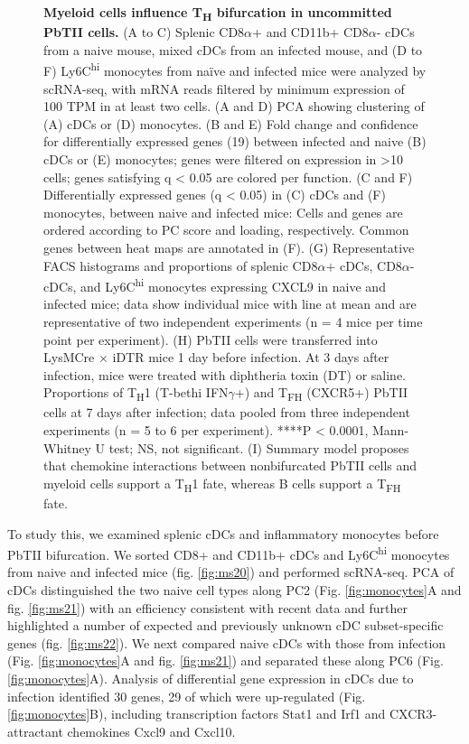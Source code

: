 \begin{figure} [t!]
      \caption[Myeloid cells influence T\textsubscript{H} bifurcation in uncommitted PbTII cells]{\textbf{Myeloid cells influence T\textsubscript{H} bifurcation in uncommitted PbTII cells.} (A to C) Splenic CD8\( \alpha \)+ and CD11b+ CD8\( \alpha \)- cDCs from a naive mouse, mixed cDCs from an infected mouse, and (D to F) Ly6C\textsuperscript{hi} monocytes from naïve and infected mice were analyzed by scRNA-seq, with mRNA reads filtered by minimum expression of 100 TPM in at least two cells. (A and D) PCA showing clustering of (A) cDCs or (D) monocytes. (B and E) Fold change and confidence for differentially expressed genes (19) between infected and naive (B) cDCs or (E) monocytes; genes were filtered on expression in >10 cells; genes satisfying q < 0.05 are colored per function. (C and F) Differentially expressed genes (q < 0.05) in (C) cDCs and (F) monocytes, between naive and infected mice: Cells and genes are ordered according to PC score and loading, respectively. Common genes between heat maps are annotated in (F). (G) Representative FACS histograms and proportions of splenic CD8\( \alpha \)+ cDCs, CD8\( \alpha \)- cDCs, and Ly6C\textsuperscript{hi} monocytes expressing CXCL9 in naive and infected mice; data show individual mice with line at mean and are representative of two independent experiments (n = 4 mice per time point per experiment). (H) PbTII cells were transferred into LysMCre × iDTR mice 1 day before infection. At 3 days after infection, mice were treated with diphtheria toxin (DT) or saline. Proportions of T\textsubscript{H}1 (T-bethi IFN\( \gamma \)+) and T\textsubscript{FH} (CXCR5+) PbTII cells at 7 days after infection; data pooled from three independent experiments (n = 5 to 6 per experiment). ****P < 0.0001, Mann-Whitney U test; NS, not significant. (I) Summary model proposes that chemokine interactions between nonbifurcated PbTII cells and myeloid cells support a T\textsubscript{H}1 fate, whereas B cells support a T\textsubscript{FH} fate.}
\end{figure}

To study this, we examined splenic cDCs and inflammatory monocytes before PbTII bifurcation. We sorted CD8+ and CD11b+ cDCs and Ly6C\textsuperscript{hi} monocytes from naive and infected mice (fig. \ref{fig:ms20}) and performed scRNA-seq. PCA of cDCs distinguished the two naive cell types along PC2 (Fig. \ref{fig:monocytes}A and fig. \ref{fig:ms21}) with an efficiency consistent with recent data \cite{Jaitin2014-pk} and further highlighted a number of expected and previously unknown cDC subset-specific genes (fig. \ref{fig:ms22}). We next compared naive cDCs with those from infection (Fig. \ref{fig:monocytes}A and fig. \ref{fig:ms21}) and separated these along PC6 (Fig. \ref{fig:monocytes}A). Analysis of differential gene expression in cDCs due to infection identified 30 genes, 29 of which were up-regulated (Fig. \ref{fig:monocytes}B), including transcription factors Stat1 and Irf1 and CXCR3-attractant chemokines Cxcl9 and Cxcl10.

